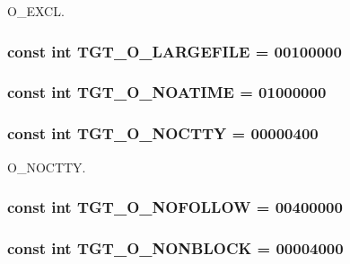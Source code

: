 O\_\-EXCL. \hypertarget{classX86Linux32_a9600e092a6309f94d92129ce5f85b945}{
\subsubsection[{TGT\_\-O\_\-LARGEFILE}]{\setlength{\rightskip}{0pt plus 5cm}const int {\bf TGT\_\-O\_\-LARGEFILE} = 00100000}}
\label{classX86Linux32_a9600e092a6309f94d92129ce5f85b945}
\hypertarget{classX86Linux32_a0ee8b0c23c2babc48e978e872b03c82c}{
\subsubsection[{TGT\_\-O\_\-NOATIME}]{\setlength{\rightskip}{0pt plus 5cm}const int {\bf TGT\_\-O\_\-NOATIME} = 01000000}}
\label{classX86Linux32_a0ee8b0c23c2babc48e978e872b03c82c}
\hypertarget{classX86Linux32_adfd4240281579e5f60c5e22c601225d8}{
\subsubsection[{TGT\_\-O\_\-NOCTTY}]{\setlength{\rightskip}{0pt plus 5cm}const int {\bf TGT\_\-O\_\-NOCTTY} = 00000400}}
\label{classX86Linux32_adfd4240281579e5f60c5e22c601225d8}


O\_\-NOCTTY. \hypertarget{classX86Linux32_a9c27f68ab31ddfdd3e35800ea1f02a89}{
\subsubsection[{TGT\_\-O\_\-NOFOLLOW}]{\setlength{\rightskip}{0pt plus 5cm}const int {\bf TGT\_\-O\_\-NOFOLLOW} = 00400000}}
\label{classX86Linux32_a9c27f68ab31ddfdd3e35800ea1f02a89}
\hypertarget{classX86Linux32_a0ea5420b4c9b45ba342a266fb77ac942}{
\subsubsection[{TGT\_\-O\_\-NONBLOCK}]{\setlength{\rightskip}{0pt plus 5cm}const int {\bf TGT\_\-O\_\-NONBLOCK} = 00004000}}
\label{classX86Linux32_a0ea5420b4c9b45ba342a266fb77ac942}


